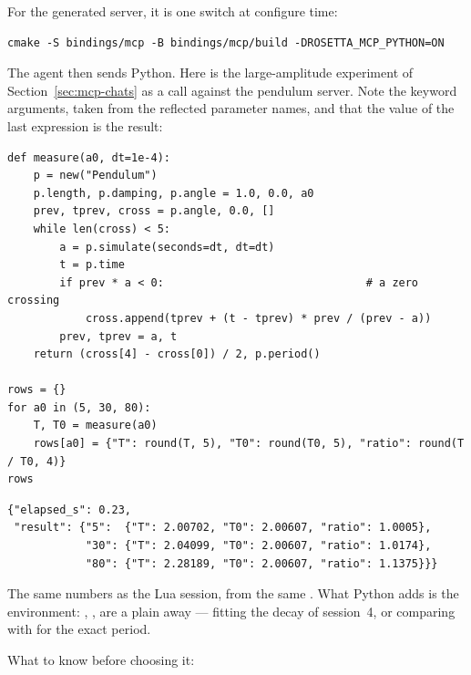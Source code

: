 For the generated server, it is one switch at configure time:

\begin{lstlisting}[style=sh]
cmake -S bindings/mcp -B bindings/mcp/build -DROSETTA_MCP_PYTHON=ON
\end{lstlisting}

The agent then sends Python. Here is the large-amplitude experiment of
Section~\ref{sec:mcp-chats} as a  call against the pendulum
server. Note the keyword arguments, taken from the reflected parameter names,
and that the value of the last expression is the result:

\begin{lstlisting}[style=py]
def measure(a0, dt=1e-4):
    p = new("Pendulum")
    p.length, p.damping, p.angle = 1.0, 0.0, a0
    prev, tprev, cross = p.angle, 0.0, []
    while len(cross) < 5:
        a = p.simulate(seconds=dt, dt=dt)
        t = p.time
        if prev * a < 0:                               # a zero crossing
            cross.append(tprev + (t - tprev) * prev / (prev - a))
        prev, tprev = a, t
    return (cross[4] - cross[0]) / 2, p.period()

rows = {}
for a0 in (5, 30, 80):
    T, T0 = measure(a0)
    rows[a0] = {"T": round(T, 5), "T0": round(T0, 5), "ratio": round(T / T0, 4)}
rows
\end{lstlisting}

\begin{lstlisting}[style=json]
{"elapsed_s": 0.23,
 "result": {"5":  {"T": 2.00702, "T0": 2.00607, "ratio": 1.0005},
            "30": {"T": 2.04099, "T0": 2.00607, "ratio": 1.0174},
            "80": {"T": 2.28189, "T0": 2.00607, "ratio": 1.1375}}}
\end{lstlisting}

The same numbers as the Lua session, from the same . What
Python adds is the environment: , , 
are a plain  away --- fitting the decay of session~4, or comparing
with  for the exact period.

What to know before choosing it:

